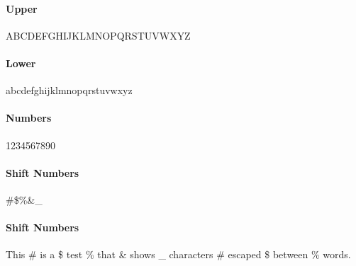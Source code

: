 \documentclass[10pt]{article}%
\begin{document}
%

\paragraph{Upper}
ABCDEFGHIJKLMNOPQRSTUVWXYZ

\paragraph{Lower}
abcdefghijklmnopqrstuvwxyz

\paragraph{Numbers}
1234567890

\paragraph{Shift Numbers}
\#\$\%\&\_

\paragraph{Shift Numbers}
This \# is a \$ test \% that \& shows \_ characters \# escaped \$ between \%
words.
\end{document}
